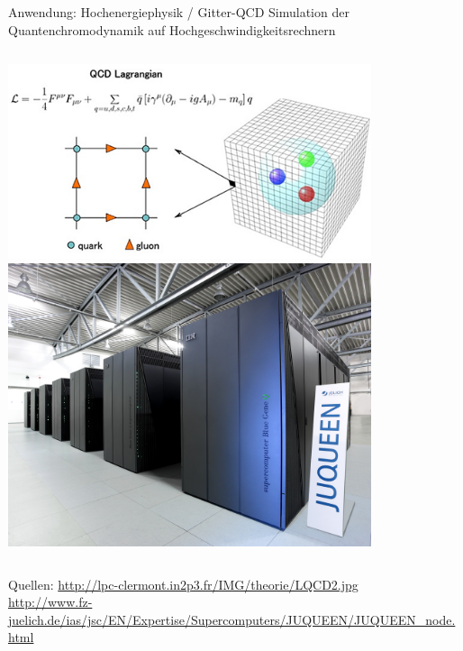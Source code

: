 \documentclass[xcolor=dvipsnames]{beamer}
\begin{document}
\begin{frame}{Anwendung: Hochenergiephysik / Gitter-QCD}
  \centering
  Simulation der Quantenchromodynamik auf Hochgeschwindigkeitsrechnern\\ \vspace{0.2cm}
  \begin{columns}
    \includegraphics[width=0.8\textwidth]{graphics/LQCD2.jpg} \\
    \includegraphics[width=0.8\textwidth]{graphics/juqueen.jpg} \\
  \end{columns}
  \vspace{0.3cm}
  {\small Quellen: \url{http://lpc-clermont.in2p3.fr/IMG/theorie/LQCD2.jpg} \\
                   \url{http://www.fz-juelich.de/ias/jsc/EN/Expertise/Supercomputers/JUQUEEN/JUQUEEN_node.html} }
\end{frame}
\end{document}
